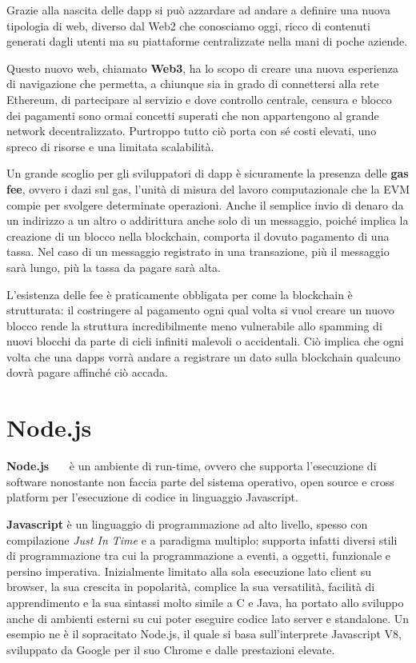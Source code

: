 Grazie alla nascita delle dapp si può azzardare ad andare a definire una nuova
tipologia di web, diverso dal Web2 che conosciamo oggi, ricco di contenuti generati
dagli utenti ma su piattaforme centralizzate nella mani di poche aziende.

Questo nuovo web, chiamato \textbf{Web3}, ha lo scopo di creare una nuova
esperienza di navigazione che permetta, a chiunque sia in grado di connettersi
alla rete Ethereum, di partecipare al servizio e dove controllo centrale,
censura e blocco dei pagamenti sono ormai concetti superati che non appartengono
al grande network decentralizzato. Purtroppo tutto ciò porta con sé costi elevati,
uno spreco di risorse e una limitata scalabilità.

Un grande scoglio per gli sviluppatori di dapp è sicuramente la presenza
delle \textbf{gas fee}, ovvero i dazi sul \textsf{gas}, l'unità di misura del
lavoro computazionale che la EVM compie per svolgere determinate operazioni.
Anche il semplice invio di denaro da un indirizzo a un altro o addirittura anche
solo di un messaggio, poiché implica la creazione di un blocco nella blockchain,
comporta il dovuto pagamento di una tassa. Nel caso di un messaggio registrato in
una transazione, più il messaggio sarà lungo, più la tassa da pagare sarà alta.

L'esistenza delle fee è praticamente obbligata per come la blockchain è strutturata:
il costringere al pagamento ogni qual volta si vuol creare un nuovo blocco rende
la struttura incredibilmente meno vulnerabile allo spamming di nuovi blocchi da
parte di cicli infiniti malevoli o accidentali.
Ciò implica che ogni volta che una dapps vorrà andare a registrare un dato sulla
blockchain qualcuno dovrà pagare affinché ciò accada. 

\section{Node.js}

\textbf{Node.js}~\cite{njs-1}~\cite{njs-2}~\cite{njs-3} è un ambiente di run-time, ovvero che supporta l'esecuzione di
software nonostante non faccia parte del sistema operativo, open source e cross
platform per l'esecuzione di codice in linguaggio Javascript.

\textbf{Javascript} è un linguaggio di programmazione ad alto livello,
spesso con compilazione \emph{Just In Time} e a paradigma multiplo: supporta infatti diversi
stili di programmazione tra cui la programmazione a eventi, a oggetti,
funzionale e persino imperativa.
Inizialmente limitato alla sola esecuzione lato client su browser,
la sua crescita in popolarità, complice la sua versatilità, facilità
di apprendimento e la sua sintassi molto simile a C e Java, ha portato
allo sviluppo anche di ambienti esterni su cui poter eseguire codice lato server
e standalone. Un esempio ne è il sopracitato Node.js, il quale si basa sull'interprete
Javascript V8, sviluppato da Google per il suo Chrome e dalle prestazioni elevate.

